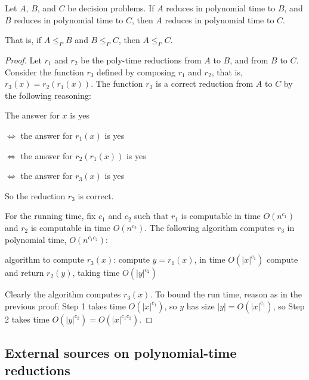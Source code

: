 \begin{lemma}\label{flow: transitive}
  Let $A$, $B$, and $C$ be decision problems.
  If $A$ reduces in polynomial time to $B$,
  and $B$ reduces in polynomial time to $C$,
  then $A$ reduces in polynomial time to $C$.

  That is, if $A\le_P B$ and $B\le_P C$, then $A\le_P C$.
\end{lemma}
\begin{proof}
  Let $r_1$ and $r_2$ be the poly-time reductions from $A$ to $B$, and from $B$ to $C$.
  Consider the function $r_3$ defined by composing $r_1$ and $r_2$,
  that is, $r_3(x) = r_2(r_1(x))$.
  The function $r_3$ is a correct reduction from $A$ to $C$ by the following reasoning:

  The answer for $x$ is \textsf{yes}

  $\iff$ the answer for $r_1(x)$ is \textsf{yes}

  $\iff$ the answer for $r_2(r_1(x))$ is \textsf{yes}

  $\iff$ the answer for $r_3(x)$ is \textsf{yes}

  \smallskip
  So the reduction $r_3$ is correct.
  
  For the running time, fix $c_1$ and $c_2$ such that
  $r_1$ is computable in time $O(n^{c_1})$
  and $r_2$ is computable in time $O(n^{c_2})$.
  The following algorithm computes $r_3$ in polynomial time, $O(n^{c_1 c_2})$:

  \begin{myframed}
    \begin{steps}
    \item[] algorithm to compute $r_3(x)$:
      \step compute $y = r_1(x)$, in time $O(|x|^{c_1})$
      \step compute and return $r_2(y)$, taking time $O(|y|^{c_2})$
    \end{steps}
  \end{myframed}
  \smallskip

  Clearly the algorithm computes $r_3(x)$.
  To bound the run time,
  reason as in the previous proof:
  Step 1 takes time $O(|x|^{c_1})$,
  so $y$ has size $|y|=O(|x|^{c_1})$,
  so Step 2 takes time $O(|y|^{c_2}) = O(|x|^{c_1 c_2})$.
\end{proof}

\subsection{External sources on polynomial-time reductions}



